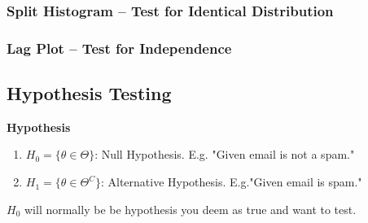 \documentclass[13pt]{article}
\theoremstyle{definition}
\theoremstyle{remark}
\begin{document}
\subsubsection{Split Histogram -- Test for Identical Distribution}


\subsubsection{Lag Plot -- Test for Independence}


\subsection{Hypothesis Testing}
\textbf{Hypothesis}
\begin{enumerate}[label=\textbullet]
    \item $H_0 = \{\theta \in \Theta\}$: Null Hypothesis. E.g. "Given email is not a spam."
    \item $H_1= \{\theta \in \Theta^{C}\}$: Alternative Hypothesis. E.g."Given email is spam."
\end{enumerate}
{\color{C3} $H_0$ will normally be be hypothesis you deem as true and want to test.}
\end{document}
